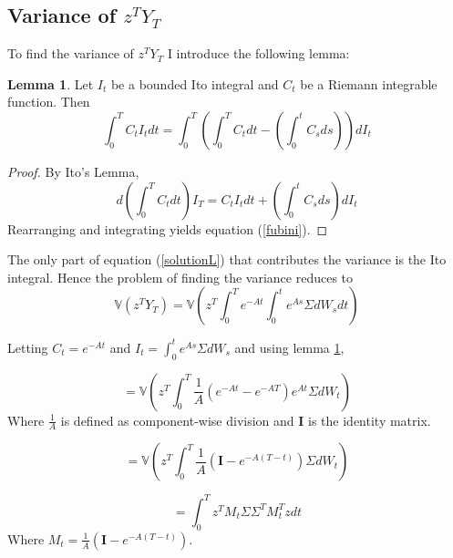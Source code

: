 \documentclass[12pt]{article}
\theoremstyle{definition}
\newtheorem{lemma}{Lemma}
\begin{document}
\subsection{Variance of \(z^T Y_T\)}
To find the variance of \(z^T Y_T\) I introduce the following lemma:

\begin{lemma} \label{lemma1}
Let \(I_t\) be a bounded Ito integral  and \(C_t\) be a Riemann integrable function.  Then 
\begin{equation} \label{fubini} \int_ 0^ T  C_t I_t dt=  \int_ 0^ T \left(\int_0 ^ T C_t  dt-\left(\int_0 ^ t C_s ds\right)\right) dI_t
\end{equation}

\end{lemma}

\begin{proof}
By Ito's Lemma,
\begin{equation}
d\left(\int_0 ^ T C_t dt\right) I_T= C_t I_t dt +\left(\int_0 ^ t C_s ds\right) dI_t
\end{equation}
Rearranging and integrating yields equation (\ref{fubini}).
\end{proof}

The only part of equation (\ref{solutionL}) that contributes the variance is the Ito integral.  Hence the problem of finding the variance reduces to 
\begin{equation}
\mathbb{V}(z^T Y_T)=\mathbb{V}\left(z^T \int_0 ^ T e^{-At} \int_ 0 ^ t e^{As} \Sigma dW_s dt \right)
\end{equation}

Letting \(C_t=e^{-At}\) and \(I_t=\int_ 0 ^ t e^{As} \Sigma dW_s \) and using lemma \ref{lemma1},

\begin{equation}
=\mathbb{V}\left(z^T  \int_ 0 ^ T \frac{1}{A}\left( e^{-At} -e^{-AT} \right) e^{At}\Sigma dW_t  \right)
\end{equation}
Where \(\frac{1}{A}\) is defined as component-wise division and \(\mathbf{I}\) is the identity matrix.

\begin{equation}
=\mathbb{V}\left(z^T  \int_ 0 ^ T \frac{1}{A}\left( \mathbf{I}-e^{-A(T-t)} \right)\Sigma dW_t  \right)
\end{equation}

\begin{equation}
=\int_ 0 ^ T z^T M_t \Sigma \Sigma ^T M_t^T z dt  
\end{equation}
Where \(M_t=\frac{1}{A}\left( \mathbf{I}-e^{-A(T-t)} \right)\).
\end{document}
